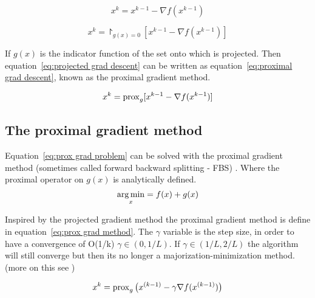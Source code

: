 		\begin{equation}
			x^k = x^{k-1} - \nabla f(x^{k-1})
			\label{eq:grad descent}
		\end{equation}
		
		\begin{equation}
			x^k = \project_{g(x)=0}[ x^{k-1} - \nabla f(x^{k-1})]
			\label{eq:projected grad descent}
		\end{equation}
		
		If $g(x)$ is the indicator function of the set onto which is projected. Then  equation~\ref{eq:projected grad descent} can be written as equation~\ref{eq:proximal grad descent}, known as the proximal gradient method.
		
		\begin{equation}
				x^k = \operatorname{prox}_{g}[ x^{k-1} - \nabla f(x^{k-1})]
			\label{eq:proximal grad descent}
		\end{equation}
	
	\subsection{The proximal gradient method}
		Equation~\ref{eq:prox grad problem} can be solved with the proximal gradient method (sometimes called forward backward splitting - FBS) . Where the proximal operator on $g(x)$ is analytically defined. 
			\begin{equation}
			\underset{x}{\operatorname*{arg\,min}} = f(x) + g(x)
			\label{eq:prox grad problem}
			\end{equation}
		
		Inspired by the projected gradient method the proximal gradient method is define in equation~\ref{eq:prox grad method}. The $\gamma$ variable is the step size, in order to have a convergence of O(1/k) $\gamma \in(0,1/L)$. If $\gamma \in (1/L,2/L)$ the algorithm will still converge but then its no longer a majorization-minimization method. (more on this see \cite{NealParikh})
		
		\begin{equation}
			x^k = \operatorname{prox}_{g}\big( x^{(k-1)}- \gamma \nabla f(x^{(k-1)})\big)
			\label{eq:prox grad method}
		\end{equation}	
	

